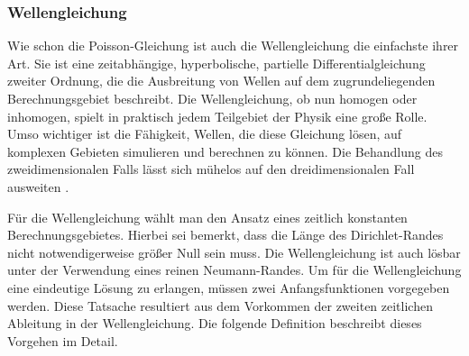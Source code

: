 \documentclass[crop=false]{standalone}
\begin{document}
      \subsubsection{Wellengleichung} %
      \label{ssub:wellengleichung}
        Wie schon die Poisson-Gleichung ist auch die Wellengleichung die einfachste ihrer Art.
        Sie ist eine zeitabhängige, hyperbolische, partielle Differentialgleichung zweiter Ordnung, die die Ausbreitung von Wellen auf dem zugrundeliegenden Berechnungsgebiet beschreibt.
        Die Wellengleichung, ob nun homogen oder inhomogen, spielt in praktisch jedem Teilgebiet der Physik eine große Rolle.
        Umso wichtiger ist die Fähigkeit, Wellen, die diese Gleichung lösen, auf komplexen Gebieten simulieren und berechnen zu können.
        Die Behandlung des zweidimensionalen Falls lässt sich mühelos auf den dreidimensionalen Fall ausweiten \cite[S.~229~ff]{Schweizer2013}.

        Für die Wellengleichung wählt man den Ansatz eines zeitlich konstanten Berechnungsgebietes.
        Hierbei sei bemerkt, dass die Länge des Dirichlet-Randes nicht notwendigerweise größer Null sein muss.
        Die Wellengleichung ist auch lösbar unter der Verwendung eines reinen Neumann-Randes.
        Um für die Wellengleichung eine eindeutige Lösung zu erlangen, müssen zwei Anfangsfunktionen vorgegeben werden.
        Diese Tatsache resultiert aus dem Vorkommen der zweiten zeitlichen Ableitung in der Wellengleichung.
        Die folgende Definition beschreibt dieses Vorgehen im Detail.
        \cite{Schweizer2013}
\end{document}
